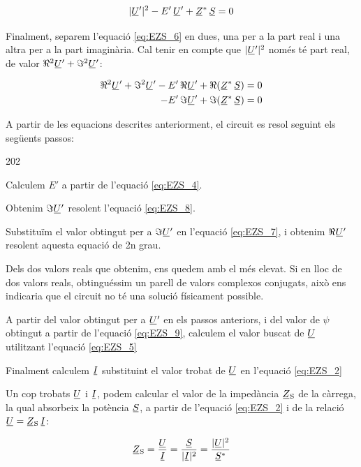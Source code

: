 \begin{equation}
   |\cmplx{U}'|^2 - E' \, \cmplx{U}' + \cmplx{Z}^* \, \cmplx{S} = 0 \label{eq:EZS_6}
\end{equation}

Finalment, separem l'equació \eqref{eq:EZS_6} en dues, una per a la part real i una altra per a la part imaginària. Cal tenir en compte que $|\cmplx{U}'|^2$ només té part real, de valor $\Re^2\cmplx{U}' + \Im^2\cmplx{U}'$:

\begin{align}
   \Re^2\cmplx{U}' + \Im^2\cmplx{U}' - E' \, \Re\cmplx{U}' + \Re(\cmplx{Z}^* \, \cmplx{S}) &= 0 \label{eq:EZS_7} \\
   - E' \, \Im\cmplx{U}' + \Im(\cmplx{Z}^* \, \cmplx{S}) &= 0 \label{eq:EZS_8}
\end{align}

A partir de les equacions descrites anteriorment, el circuit es resol seguint els següents passos:
\begin{dingautolist}{202}
   \item Calculem $E'$ a partir de l'equació \eqref{eq:EZS_4}.
   \item Obtenim $\Im\cmplx{U}'$ resolent l'equació \eqref{eq:EZS_8}.
   \item Substituïm el valor obtingut per a $\Im\cmplx{U}'$ en l'equació \eqref{eq:EZS_7}, i obtenim $\Re\cmplx{U}'$ resolent aquesta equació de 2n grau.
   \item Dels dos valors reals que obtenim, ens quedem amb el més elevat. Si en lloc de dos valors reals, obtinguéssim un parell de valors  complexos conjugats, això ens indicaria que el circuit no té una solució físicament possible.
   \item A partir del valor  obtingut per a $\cmplx{U}'$ en els passos anteriors, i del valor de $\psi$ obtingut a partir de l'equació \eqref{eq:EZS_9}, calculem el valor buscat de $\cmplx{U}$ utilitzant l'equació \eqref{eq:EZS_5}
   \item Finalment calculem $\cmplx{I}$ substituint el valor trobat de $\cmplx{U}$ en l'equació \eqref{eq:EZS_2}
\end{dingautolist}

Un cop trobats $\cmplx{U}$ i $\cmplx{I}$, podem calcular el valor de
la impedància  $\cmplx{Z}\ped{S}$ de la càrrega, la qual absorbeix
la potència $\cmplx{S}$, a partir de l'equació \eqref{eq:EZS_2} i de
la relació $\cmplx{U} = \cmplx{Z}\ped{S} \,\cmplx{I}$:

\begin{equation}
   \cmplx{Z}\ped{S} = \frac{\cmplx{U}}{\cmplx{I}} =
   \frac{\cmplx{S}}{|\cmplx{I}|^2} =
   \frac{|\cmplx{U}|^2}{\cmplx{S}^*} \label{eq:EZS 10}
\end{equation}


